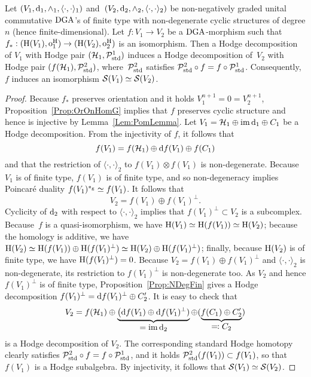 \documentclass[\MainFolder/Text.tex]{subfiles}
\begin{document}
\begin{Lemma}\label{Eq:LemSmallSub}
Let $(V_1,\mathrm{d}_1,\wedge_1,\langle\cdot,\cdot\rangle_1)$ and~$(V_2,\mathrm{d}_2,\wedge_2,\langle\cdot,\cdot\rangle_2)$ be non-negatively graded unital commutative $\mathrm{DGA}$'s of finite type with non-degenerate cyclic structures of degree $n$ (hence finite-dimensional). Let $f: V_1 \rightarrow V_2$ be a $\mathrm{DGA}$-morphism such that $f_*: (\mathrm{H}(V_1),\mathrm{o}_1^{\mathrm{H}})\rightarrow (\mathrm{H}(V_2),\mathrm{o}_2^{\mathrm{H}})$ is an isomorphism. Then a Hodge decomposition of $V_1$ with Hodge pair $(\mathcal{H}_1,\mathcal{P}_{\mathrm{std}}^1)$ induces a Hodge decomposition of~$V_2$ with Hodge pair $(f(\mathcal{H}_1),\mathcal{P}_{\mathrm{std}}^2)$, where~$\mathcal{P}_{\mathrm{std}}^2$ satisfies $\mathcal{P}_{\mathrm{std}}^2 \circ f = f\circ \mathcal{P}_{\mathrm{std}}^1$. Consequently,~$f$ induces an isomorphism $\mathcal{S}(V_1) \simeq \mathcal{S}(V_2)$.
\end{Lemma}
\begin{proof}
Because $f_*$ preserves orientation and it holds $V_1^{n+1} = 0 = V_2^{n+1}$, Proposition~\ref{Prop:OrOnHomG} implies that $f$ preserves cyclic structure and hence is injective by Lemma~\ref{Lem:PomLemma}. Let $V_1 = \mathcal{H}_1 \oplus \operatorname{im} \mathrm{d}_1 \oplus C_1$ be a Hodge decomposition. From the injectivity of $f$, it follows that
\[ f(V_1) = f(\mathcal{H}_1) \oplus \mathrm{d} f(V_1) \oplus f(C_1) \]
and that the restriction of $\langle\cdot,\cdot\rangle_2$ to $f(V_1)\otimes f(V_1)$ is non-degenerate. Because $V_1$ is of finite type, $f(V_1)$ is of finite type, and so non-degeneracy implies Poincar\'e duality $f(V_1)^{*_{\mathrm{g}}}\simeq f(V_1)$. It follows that
\[ V_2 = f(V_1) \oplus f(V_1)^\perp.\]
Cyclicity of $\mathrm{d}_2$ with respect to $\langle\cdot,\cdot\rangle_2$ implies that $f(V_1)^\perp\subset V_2$ is a subcomplex. Because~$f$ is a quasi-isomorphism, we have $\mathrm{H}(V_1)\simeq \mathrm{H}(f(V_1))\simeq \mathrm{H}(V_2)$; because the homology is additive, we have $\mathrm{H}(V_2)\simeq\mathrm{H}(f(V_1))\oplus\mathrm{H}(f(V_1)^\perp)\simeq \mathrm{H}(V_2)\oplus\mathrm{H}(f(V_1)^\perp)$; finally, because $\mathrm{H}(V_2)$ is of finite type, we have $\mathrm{H}(f(V_1)^\perp) = 0$. Because $V_2 = f(V_1) \oplus f(V_1)^\perp$ and $\langle\cdot,\cdot\rangle_2$ is non-degenerate, its restriction to $f(V_1)^\perp$ is non-degenerate too. As $V_2$ and hence $f(V_1)^\perp$ is of finite type, Proposition~\ref{Prop:NDegFin} gives a Hodge decomposition $f(V_1)^\perp = \mathrm{d} f(V_1)^\perp \oplus C_2'$. It is easy to check that 
\[ V_2 = f(\mathcal{H}_1)\oplus\underbrace{\bigl(\mathrm{d} f(V_1) \oplus \mathrm{d} f(V_1)^\perp)}_{\displaystyle=\operatorname{im}\mathrm{d}_2}\oplus(\underbrace{f(C_1)\oplus C_2'}_{\displaystyle\eqqcolon C_2})\]
is a Hodge decomposition of $V_2$. The corresponding standard Hodge homotopy clearly satisfies $\mathcal{P}_{\mathrm{std}}^2 \circ f = f\circ \mathcal{P}_{\mathrm{std}}^1$, and it holds $\mathcal{P}_{\mathrm{std}}^2(f(V_1)) \subset f(V_1)$, so that $f(V_1)$ is a Hodge subalgebra. By injectivity, it follows that $\mathcal{S}(V_1) \simeq \mathcal{S}(V_2)$.
\end{proof}
\end{document}
